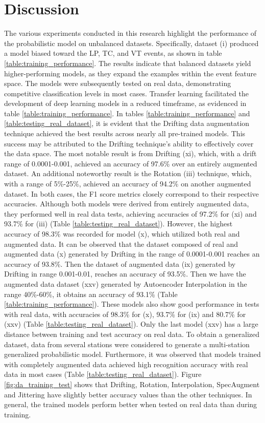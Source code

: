 \documentclass[journal]{IEEEtran}
\begin{document}
\section{Discussion}\label{discussion}
The various experiments conducted in this research highlight the performance of the probabilistic model on unbalanced datasets. Specifically, dataset (i) produced a model biased toward the LP, TC, and VT events, as shown in table \ref{table:training_performance}.
The results indicate that balanced datasets yield higher-performing models, as they expand the examples within the event feature space. The models were subsequently tested on real data, demonstrating competitive classification levels in most cases. Transfer learning facilitated the development of deep learning models in a reduced timeframe, as evidenced in table \ref{table:training_performance}.
In tables \ref{table:training_performance} and \ref{table:testing_real_dataset}, it is evident that the Drifting data augmentation technique achieved the best results across nearly all pre-trained models. This success may be attributed to the Drifting technique's ability to effectively cover the data space. The most notable result is from Drifting (xi), which, with a drift range of 0.0001-0.001, achieved an accuracy of 97.6\% over an entirely augmented dataset. An additional noteworthy result is the Rotation (iii) technique, which, with a range of 5\%-25\%, achieved an accuracy of 94.2\% on another augmented dataset.
In both cases, the F1 score metrics closely correspond to their respective accuracies. Although both models were derived from entirely augmented data, they performed well in real data tests, achieving accuracies of 97.2\% for (xi) and 93.7\% for (iii) (Table \ref{table:testing_real_dataset}). However, the highest accuracy of 98.3\% was recorded for model (x), which utilized both real and augmented data.
It can be observed that the dataset composed of real and augmented data (x) generated by Drifting in the range of 0.0001-0.001 reaches an accuracy of 93.8\%. Then the dataset of augmented data (ix) generated by Drifting in range 0.001-0.01, reaches an accuracy of 93.5\%. Then we have the augmented data dataset (xxv) generated by Autoencoder Interpolation in the range 40\%-60\%, it obtains an accuracy of 93.1\% (Table \ref{table:training_performance}). These models also show good performance in tests with real data, with accuracies of 98.3\% for (x), 93.7\% for (ix) and 80.7\% for (xxv) (Table \ref{table:testing_real_dataset}). Only the last model (xxv) has a large distance between training and test accuracy on real data.
To obtain a generalized dataset, data from several stations were considered to generate a multi-station generalized probabilistic model. Furthermore, it was observed that models trained with completely augmented data achieved high recognition accuracy with real data in most cases (Table \ref{table:testing_real_dataset}).
Figure \ref{fig:da_training_test} shows that Drifting, Rotation, Interpolation, SpecAugment and Jittering have slightly better accuracy values than the other techniques. In general, the trained models perform better when tested on real data than during training. \\
\end{document}
